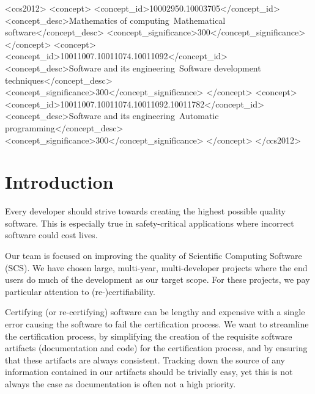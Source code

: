 \documentclass[sigconf]{acmart}
\begin{document}
%
%
 \begin{CCSXML}
<ccs2012>
<concept>
<concept_id>10002950.10003705</concept_id>
<concept_desc>Mathematics of computing~Mathematical software</concept_desc>
<concept_significance>300</concept_significance>
</concept>
<concept>
<concept_id>10011007.10011074.10011092</concept_id>
<concept_desc>Software and its engineering~Software development techniques</concept_desc>
<concept_significance>300</concept_significance>
</concept>
<concept>
<concept_id>10011007.10011074.10011092.10011782</concept_id>
<concept_desc>Software and its engineering~Automatic programming</concept_desc>
<concept_significance>300</concept_significance>
</concept>
</ccs2012>
\end{CCSXML}



\maketitle


\section{Introduction} \label{SecIntroduction}

Every developer should strive towards creating the highest possible quality 
software. This is especially true in safety-critical applications where incorrect software 
could cost lives. 

Our team is focused on improving the quality of Scientific Computing Software 
(SCS). We have chosen large, multi-year, multi-developer projects where the end 
users do much of the development as our target scope. For these projects, we pay 
particular attention to (re-)certifiability.

Certifying (or re-certifying) software can be lengthy and expensive with a 
single error causing the software to fail the certification process. We want to 
streamline the certification process, by simplifying the creation of the 
requisite software artifacts (documentation and code) for the certification 
process, and by ensuring that these artifacts are always consistent. Tracking 
down the source of any information contained in our artifacts should be 
trivially easy, yet this is not always the case as documentation is often not a 
high priority.
\end{document}
